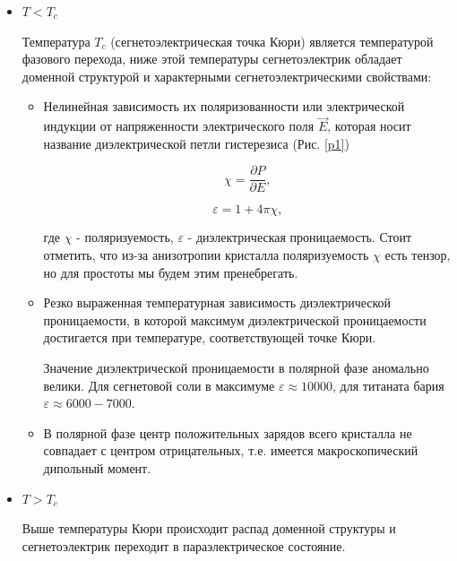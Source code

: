 \documentclass[a4paper]{article}
\begin{document}
\begin{itemize}

\item

\textbf{$T < T_c$}

Температура $T_c$ (сегнетоэлектрическая точка Кюри) является температурой фазового перехода, ниже этой температуры сегнетоэлектрик обладает доменной структурой и характерными сегнетоэлектрическими свойствами:

\begin{itemize}

\item

Нелинейная зависимость их поляризованности или электрической индукции от напряженности электрического поля $\vec{E}$, которая носит название диэлектрической петли гистерезиса (Рис. \ref{p1})

\begin{equation}
\chi = \frac{\partial P}{\partial E},
\label{1}
\end{equation}

\begin{equation}
\varepsilon = 1 + 4\pi \chi,
\label{2}
\end{equation}

где $\chi$ - поляризуемость, $\varepsilon$ - диэлектрическая проницаемость. 
Стоит отметить, что из-за анизотропии кристалла поляризуемость $\chi$ есть тензор, но для простоты мы будем этим пренебрегать. 

\item

Резко выраженная температурная зависимость диэлектрической проницаемости, в которой максимум диэлектрической проницаемости достигается при температуре, соответствующей точке Кюри.

Значение диэлектрической проницаемости в полярной фазе аномально велики. Для сегнетовой соли в максимуме $\varepsilon \approx 10000$, для титаната бария $\varepsilon \approx 6000 - 7000$. 

\item

В полярной фазе центр положительных зарядов всего кристалла не совпадает с центром отрицательных, т.е. имеется макроскопический дипольный момент. 

\end{itemize}

\item

$T > T_c$

Выше температуры Кюри происходит распад доменной структуры и сегнетоэлектрик переходит в параэлектрическое состояние. 


\end{itemize}
\end{document}
